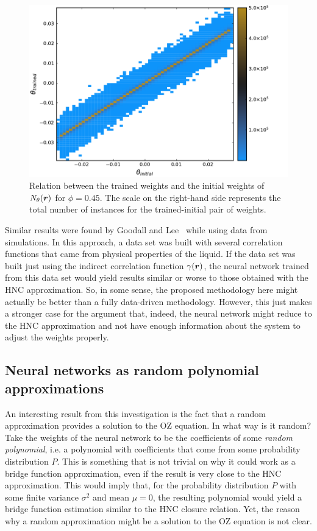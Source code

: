 \begin{figure}[t]
    \includegraphics[width=\textwidth]{figuras/capitulo-4/weights_phi=0.45.pdf}
    \caption[Comparison between weights, $\phi=0.45$.]{Relation between the trained weights and the initial weights of $N_{\theta}(\bm{r})$ for $\phi=0.45$. The scale on the right-hand side represents the total number of instances for the trained-initial pair of weights.}
    \label{fig:pesos45}
\end{figure}

Similar results were found by Goodall and Lee~\cite{a.goodallDatadrivenApproximationsBridge2021}
while using data from simulations. In this approach, a data set was built with several
correlation functions that came from physical properties of the liquid. If the data set was built
just using the indirect correlation function $\gamma(\bm{r})$, the neural network trained from this data
set would yield results similar or worse to those obtained with the HNC approximation.
So, in some sense, the proposed methodology here might actually be better than a fully
data-driven methodology. However, this just makes a stronger case for the argument that,
indeed, the neural network might reduce to the HNC approximation and not have enough
information about the system to adjust the weights properly.

\subsection{Neural networks as random polynomial approximations}
An interesting result from this investigation is the fact that a random approximation
provides a solution to the OZ equation. In what way is it random? Take the weights of the
neural network to be the coefficients of some \emph{random polynomial}, i.e. a polynomial 
with coefficients that come from some probability distribution $P$. This is something that 
is not trivial on why it could work as a bridge function approximation, even if the result
is very close to the HNC approximation. This would imply that, for the probability 
distribution $P$ with some finite variance $\sigma^2$ and mean $\mu=0$, the resulting
polynomial would yield a bridge function estimation similar to the HNC closure relation.
Yet, the reason why a random approximation might be a solution to the OZ equation is not
clear.

